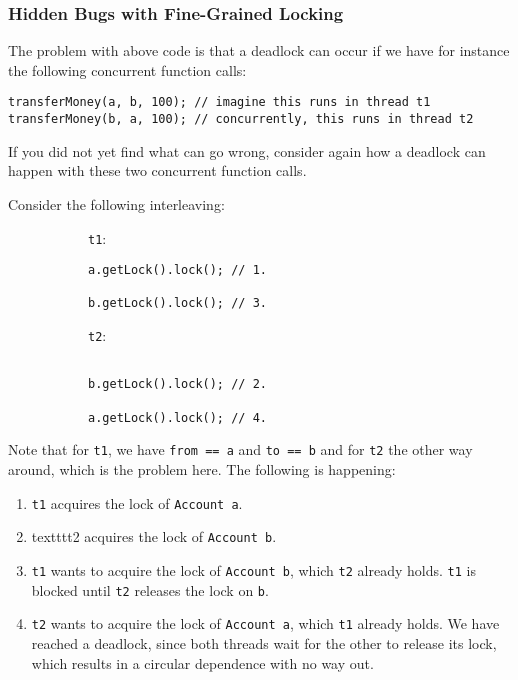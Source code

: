 \documentclass[main.tex]{subfiles}
\begin{document}
\subsubsection{Hidden Bugs with Fine-Grained Locking}
The problem with above code is that a deadlock can occur if we have for instance the following concurrent function calls:

\begin{verbatim}
transferMoney(a, b, 100); // imagine this runs in thread t1
transferMoney(b, a, 100); // concurrently, this runs in thread t2
\end{verbatim}

\noindent If you did not yet find what can go wrong, consider again how a deadlock can happen with these two concurrent function calls.

\noindent Consider the following interleaving:

\begin{figure}[H]
    \begin{subfigure}[t]{.6\textwidth}
        \texttt{t1}:
        \begin{verbatim}
a.getLock().lock(); // 1.

b.getLock().lock(); // 3.
        \end{verbatim}
    \end{subfigure}%
    \begin{subfigure}[t]{.6\textwidth}
        \texttt{t2}:
        \begin{verbatim}

b.getLock().lock(); // 2.

a.getLock().lock(); // 4.
        \end{verbatim}
    \end{subfigure}
\end{figure}

\noindent Note that for \texttt{t1}, we have \texttt{from == a} and \texttt{to == b} and for \texttt{t2} the other way around, which is the problem here. The following is happening:

\begin{enumerate}
  \item \texttt{t1} acquires the lock of \texttt{Account a}.
  \item texttt{t2} acquires the lock of \texttt{Account b}.
  \item \texttt{t1} wants to acquire the lock of \texttt{Account b}, which \texttt{t2} already holds. \texttt{t1} is blocked until \texttt{t2} releases the lock on \texttt{b}.
  \item \texttt{t2} wants to acquire the lock of \texttt{Account a}, which \texttt{t1} already holds. We have reached a deadlock, since both threads wait for the other to release its lock, which results in a circular dependence with no way out.
\end{enumerate}
\end{document}
